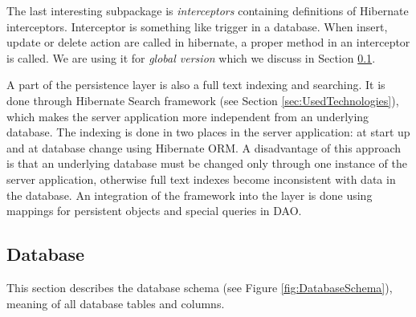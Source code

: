 The last interesting subpackage is \emph{interceptors} containing definitions
of Hibernate interceptors. Interceptor is something like trigger in a database.
When insert, update or delete action are called in hibernate, a proper method
in an interceptor is called. We are using it for \emph{global version} which we
discuss in Section \ref{sec:Database}.

A part of the persistence layer is also a full text indexing and searching. It is
done through Hibernate Search framework (see Section \ref{sec:UsedTechnologies}),
which makes the server application more independent from an underlying database.
The indexing is done in two places in the server application: at start up and at
database change using Hibernate ORM. A disadvantage of this approach is that
an underlying database must be changed only through one instance of the server
application, otherwise full text indexes become inconsistent with data in the database.
An integration of the framework into the layer is done using mappings for persistent
objects and special queries in DAO.

\subsection{Database}
\label{sec:Database}

This section describes the database schema (see Figure \ref{fig:DatabaseSchema}),
meaning of all database tables and columns.

